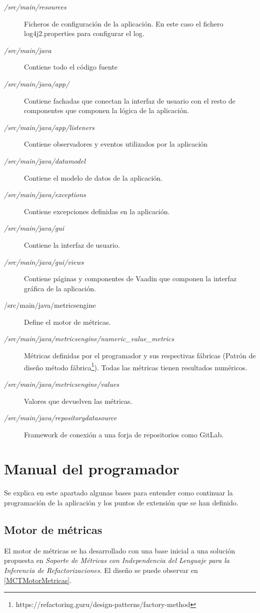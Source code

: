 \begin{description}
	\item[\textit{/src/main/resources}] Ficheros de configuración de la aplicación. En este caso el fichero log4j2.properties para configurar el log.
	\item[\textit{/src/main/java}] Contiene todo el código fuente
	\item[\textit{/src/main/java/app/}] Contiene fachadas que conectan la interfaz de usuario con el resto de componentes que componen la lógica de la aplicación.
	\item[\textit{/src/main/java/app/listeners}] Contiene observadores y eventos utilizados por la aplicación
	\item[\textit{/src/main/java/datamodel}] Contiene el modelo de datos de la aplicación.
	\item[\textit{/src/main/java/exceptions}] Contiene excepciones definidas en la aplicación.
	\item[\textit{/src/main/java/gui}] Contiene la interfaz de usuario.
	\item[\textit{/src/main/java/gui/views}] Contiene páginas y componentes de Vaadin que componen la interfaz gráfica de la aplicación.
	\item[/src/main/java/metricsengine] Define el motor de métricas.
	\item[\textit{/src/main/java/metricsengine/numeric\_value\_metrics}] Métricas definidas por el programador y sus respectivas fábricas (Patrón de diseño método fábrica\footnote{https://refactoring.guru/design-patterns/factory-method}). Todas las métricas tienen resultados numéricos.
	\item[\textit{/src/main/java/metricsengine/values}] Valores que devuelven las métricas.
	\item[\textit{/src/main/java/repositorydatasource}] Framework de conexión a una forja de repositorios como GitLab.
\end{description}
\section{Manual del programador}
Se explica en este apartado algunas bases para entender como continuar la programación de la aplicación y los puntos de extensión que se han definido.
\subsection{Motor de métricas}
El motor de métricas se ha desarrollado con una base inicial a una solución propuesta en \textit{Soporte de Métricas con Independencia del Lenguaje para la Inferencia de Refactorizaciones}\cite{marticorena_soporte_2005}. El diseño se puede observar en \ref{MCTMotorMetricas}.
